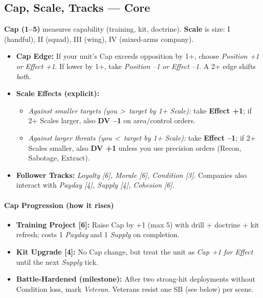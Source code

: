 \documentclass[11pt]{article}
\begin{document}
\subsection*{Cap, Scale, Tracks --- Core}
\textbf{Cap (1--5)} measures capability (training, kit, doctrine). \textbf{Scale} is size: I (handful), II (squad), III (wing), IV (mixed-arms company).
\begin{itemize}[leftmargin=*]
  \item \textbf{Cap Edge:} If your unit's Cap exceeds opposition by 1+, choose \emph{Position +1} \emph{or} \emph{Effect +1}. If lower by 1+, take \emph{Position --1} \emph{or} \emph{Effect --1}. A 2+ edge shifts \emph{both}.
  \item \textbf{Scale Effects (explicit):}
    \begin{itemize}
      \item \emph{Against smaller targets (you \textgreater\ target by 1+ Scale):} take \textbf{Effect +1}; if 2+ Scales larger, also \textbf{DV --1} on area/control orders.
      \item \emph{Against larger threats (you \textless\ target by 1+ Scale):} take \textbf{Effect --1}; if 2+ Scales smaller, also \textbf{DV +1} unless you use precision orders (Recon, Sabotage, Extract).
    \end{itemize}
  \item \textbf{Follower Tracks:} \emph{Loyalty [6], Morale [6], Condition [3]}. Companies also interact with \emph{Payday [4], Supply [4], Cohesion [6]}.
\end{itemize}

\paragraph{Cap Progression (how it rises)}
\begin{itemize}[leftmargin=*]
  \item \textbf{Training Project [6]:} Raise Cap by +1 (max 5) with drill + doctrine + kit refresh; costs 1 \emph{Payday} and 1 \emph{Supply} on completion.
  \item \textbf{Kit Upgrade [4]:} No Cap change, but treat the unit as \emph{Cap +1 for Effect} until the next \emph{Supply} tick.
  \item \textbf{Battle-Hardened (milestone):} After two strong-hit deployments without Condition loss, mark \emph{Veteran}. Veterans resist one SB (see below) per scene.
\end{itemize}
\end{document}
